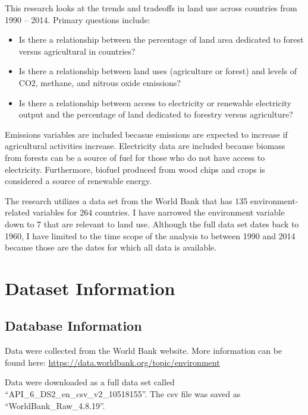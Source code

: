 \documentclass[12pt,]{article}
\providecommand{\tightlist}{%
  \setlength{\itemsep}{0pt}\setlength{\parskip}{0pt}}
\begin{document}
This research looks at the trends and tradeoffs in land use across
countries from 1990 -- 2014. Primary questions include:

\begin{itemize}
\tightlist
\item
  Is there a relationship between the percentage of land area dedicated
  to forest versus agricultural in countries?
\item
  Is there a relationship between land uses (agriculture or forest) and
  levels of CO2, methane, and nitrous oxide emissions?
\item
  Is there a relationship between access to electricity or renewable
  electricity output and the percentage of land dedicated to forestry
  versus agriculture?
\end{itemize}

Emissions variables are included becasue emissions are expected to
increase if agricultural activities increase. Electricity data are
included because biomass from forests can be a source of fuel for those
who do not have access to electricity. Furthermore, biofuel produced
from wood chips and crops is considered a source of renewable energy.

The research utilizes a data set from the World Bank that has 135
environment-related variables for 264 countries. I have narrowed the
environment variable down to 7 that are relevant to land use. Although
the full data set dates back to 1960, I have limited to the time scope
of the analysis to between 1990 and 2014 because those are the dates for
which all data is available.

\newpage

\section{Dataset Information}\label{dataset-information}

\subsection{Database Information}\label{database-information}

Data were collected from the World Bank website. More information can be
found here: \url{https://data.worldbank.org/topic/environment}

Data were downloaded as a full data set called
``API\_6\_DS2\_en\_csv\_v2\_10518155''. The csv file was saved as
``WorldBank\_Raw\_4.8.19''.
\end{document}
